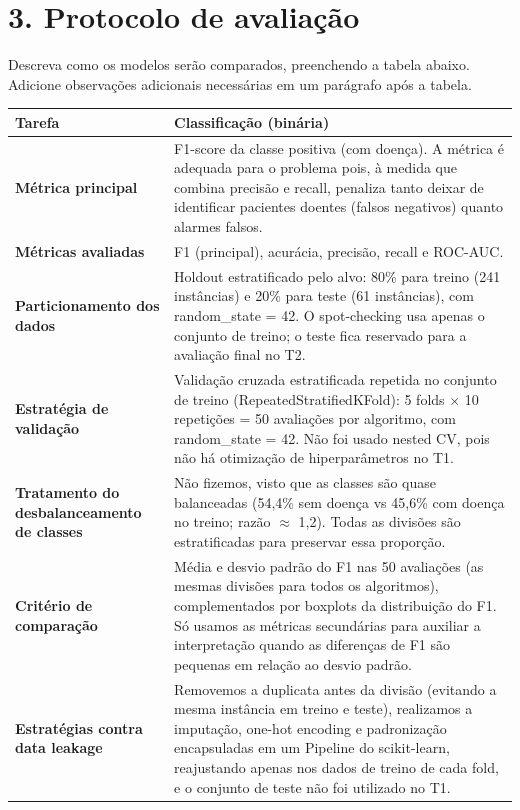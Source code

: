 \documentclass[11pt,letterpaper]{article}
\begin{document}
\clearpage
\section*{3. Protocolo de avaliação}

Descreva como os modelos serão comparados, preenchendo a tabela abaixo. Adicione observações adicionais necessárias em um parágrafo após a tabela.

\begingroup

\begin{tabular}{|L{140.680pt}|L{326.120pt}|}
\hline
\textbf{Tarefa} & \textbf{Classificação (binária)} \\ \hline

\textbf{Métrica principal} & F1-score da classe positiva (com doença). A métrica é adequada para o problema pois, à medida que combina precisão e recall, penaliza tanto deixar de identificar pacientes doentes (falsos negativos) quanto alarmes falsos. \\ \hline
\textbf{Métricas avaliadas} & F1 (principal), acurácia, precisão, recall e ROC-AUC. \\ \hline
\textbf{Particionamento dos dados} & Holdout estratificado pelo alvo: 80\% para treino (241 instâncias) e 20\% para teste (61 instâncias), com random\_state = 42. O spot-checking usa apenas o conjunto de treino; o teste fica reservado para a avaliação final no T2. \\ \hline
\textbf{Estratégia de validação} & Validação cruzada estratificada repetida no conjunto de treino (RepeatedStratifiedKFold): 5 folds \(\times\) 10 repetições = 50 avaliações por algoritmo, com random\_state = 42. Não foi usado nested CV, pois não há otimização de hiperparâmetros no T1. \\ \hline
\textbf{Tratamento do desbalanceamento de classes} & Não fizemos, visto que as classes são quase balanceadas (54,4\% sem doença vs 45,6\% com doença no treino; razão \(\approx\) 1,2). Todas as divisões são estratificadas para preservar essa proporção. \\ \hline
\textbf{Critério de comparação} & Média e desvio padrão do F1 nas 50 avaliações (as mesmas divisões para todos os algoritmos), complementados por boxplots da distribuição do F1. Só usamos as métricas secundárias para auxiliar a interpretação quando as diferenças de F1 são pequenas em relação ao desvio padrão. \\ \hline
\textbf{Estratégias contra data leakage} & Removemos a duplicata antes da divisão (evitando a mesma instância em treino e teste), realizamos a imputação, one-hot encoding e padronização encapsuladas em um Pipeline do scikit-learn, reajustando apenas nos dados de treino de cada fold, e o conjunto de teste não foi utilizado no T1. \\ \hline
\end{tabular}
\endgroup
\end{document}
